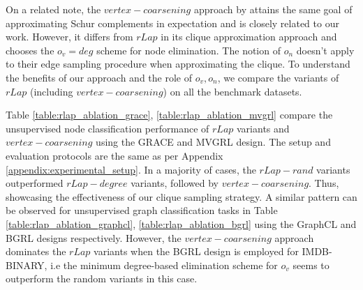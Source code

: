 \documentclass{article}
\theoremstyle{plain}
\theoremstyle{definition}
\theoremstyle{remark}
\begin{document}
On a related note, the $vertex-coarsening$ approach by \citet{fahrbach2020faster} attains the same goal of approximating Schur complements in expectation and is closely related to our work. However, it differs from $rLap$ in its clique approximation approach and chooses the $o_v=deg$ scheme for node elimination. The notion of $o_n$ doesn't apply to their edge sampling procedure when approximating the clique. To understand the benefits of our approach and the role of $o_v, o_n$, we compare the variants of $rLap$ (including $vertex-coarsening$) on all the benchmark datasets.

Table \ref{table:rlap_ablation_grace}, \ref{table:rlap_ablation_mvgrl} compare the unsupervised node classification performance of $rLap$ variants and $vertex-coarsening$ using the GRACE and MVGRL design. The setup and evaluation protocols are the same as per Appendix \ref{appendix:experimental_setup}. In a majority of cases, the $rLap-rand$ variants outperformed $rLap-degree$ variants, followed by $vertex-coarsening$. Thus, showcasing the effectiveness of our clique sampling strategy. A similar pattern can be observed for unsupervised graph classification tasks in Table \ref{table:rlap_ablation_graphcl}, \ref{table:rlap_ablation_bgrl} using the GraphCL and BGRL designs respectively. However, the $vertex-coarsening$ approach dominates the $rLap$ variants when the BGRL design is employed for IMDB-BINARY, i.e the minimum degree-based elimination scheme for $o_v$ seems to outperform the random variants in this case.
\end{document}
